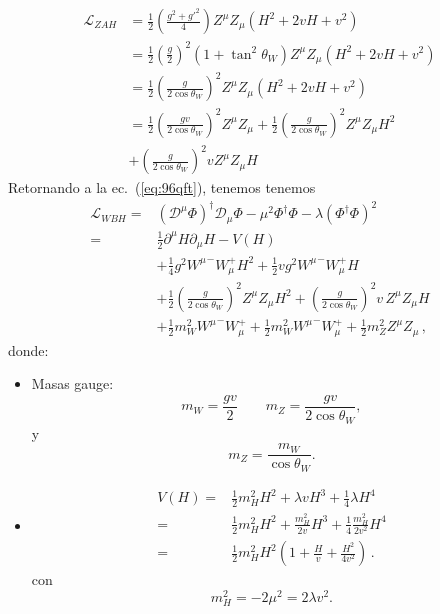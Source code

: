 \begin{frame}
\begin{align}
  \mathcal{L}_{ZAH}&=\frac{1}{2}\left(\frac{g^2+{g'}^2}{4}\right)Z^\mu Z_\mu
  \left(H^2+2vH+v^2\right)\nonumber\\
  &=\frac{1}{2}\left(\frac{g}{2}\right)^2\left(1+\tan^2\theta_W\right)Z^\mu Z_\mu\left(H^2+2vH+v^2\right)\nonumber\\
  &=\frac{1}{2}\left(\frac{g}{2\cos\theta_W}\right)^2Z^\mu Z_\mu\left(H^2+2vH+v^2\right)\nonumber\\
  &=\frac{1}{2}\left(\frac{gv}{2\cos\theta_W}\right)^2Z^\mu Z_\mu+\frac{1}{2}\left(\frac{g}{2\cos\theta_W}\right)^2Z^\mu Z_\mu H^2\nonumber\\
  &+\left(\frac{g}{2\cos\theta_W}\right)^2vZ^\mu Z_\mu H
\end{align}
Retornando a la ec.~(\ref{eq:96qft}), tenemos
tenemos
\begin{align}
  \label{eq:lwbhfin}
  \mathcal{L}_{W B H}=&\left(\mathcal{D}^\mu\Phi\right)^\dagger\mathcal{D}_\mu\Phi-\mu^2\Phi^\dagger \Phi-\lambda\left(\Phi^\dagger\Phi\right)^2\nonumber\\
  =&\frac{1}{2}\partial^\mu H\partial_\mu H-V(H)\nonumber\\
&+\frac{1}{4}g^2{W^\mu}^-W_\mu^+H^2+\frac{1}{2}vg^2{W^\mu}^-W_\mu^+H\nonumber\\
  &+\frac{1}{2}\left(\frac{g}{2\cos\theta_W}\right)^2Z^\mu Z_\mu H^2+\left(\frac{g}{2\cos\theta_W}\right)^2v\,Z^\mu Z_\mu H\nonumber\\
  &+\frac{1}{2}m_W^2{W^\mu}^-W_\mu^++\frac{1}{2}m_W^2{W^\mu}^-W_\mu^+ +\frac{1}{2}m_Z^2Z^\mu Z_\mu\,,
\end{align}
donde:
\begin{itemize} %
\item Masas gauge:
\begin{equation}
  m_W=\frac{gv}{2}
  \qquad 
  m_Z=\frac{gv}{2\cos\theta_W},
\end{equation}
y
\begin{equation}
  m_Z=\frac{m_W}{\cos\theta_W}.
\end{equation}
\item
  \begin{align}
    V(H)=&\tfrac{1}{2}m_H^2H^2+\lambda vH^3+\tfrac{1}{4}\lambda H^4\nonumber\\
    =&\frac{1}{2}m_H^2H^2+\frac{m_H^2}{2v}H^3+\frac{1}{4}\frac{m_H^2}{2v^2} H^4\nonumber\\
    =&\frac{1}{2}m_H^2H^2\left(1+\frac{H}{v}+\frac{H^2}{4v^2}\right)\,.
  \end{align}
con
\begin{equation}
  m_H^2=-2\mu^2=2\lambda v^2.
\end{equation}


\end{itemize}
\end{frame}

